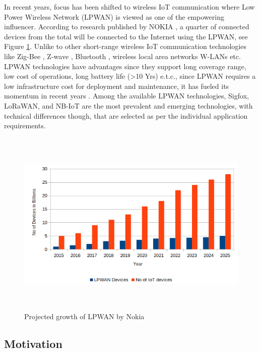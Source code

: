 \documentclass[12pt]{article}
\begin{document}
In recent years, focus has been shifted to wireless IoT communication where Low Power Wireless Network (LPWAN) is viewed as one of the empowering influencer. According to research published by NOKIA \cite{nokiaresource}, a quarter of connected devices from the total will be connected to the Internet using the LPWAN, see Figure \ref{fig:Projected Growth of LPWAN}. Unlike to other short-range wireless IoT communication technologies like Zig-Bee \cite{zigbeeAliance}, Z-wave \cite{zwave}, Bluetooth \cite{bluetooth}, wireless local area networks W-LANs etc. LPWAN technologies have advantages since they support long coverage range, low cost of operations, long battery life (>10 Yrs) e.t.c., since LPWAN requires a low infrastructure cost for deployment and maintenance, it has fueled its momentum in recent years \cite{gomez2019sigfox}. Among the available LPWAN technologies, Sigfox, LoRaWAN, and  NB-IoT are the most prevalent and emerging technologies, with technical differences though, that are selected as per the individual application requirements.\par

\begin{figure}[h!]
  \includegraphics[width=\linewidth,height=9cm]{Images/LPWAN_growth.png}
  \centering
  \caption{Projected growth of LPWAN by Nokia \cite{nokiaresource}}
  \label{fig:Projected Growth of LPWAN}
\end{figure}
\newpage

\subsection{Motivation}\label{motivation}
\end{document}
